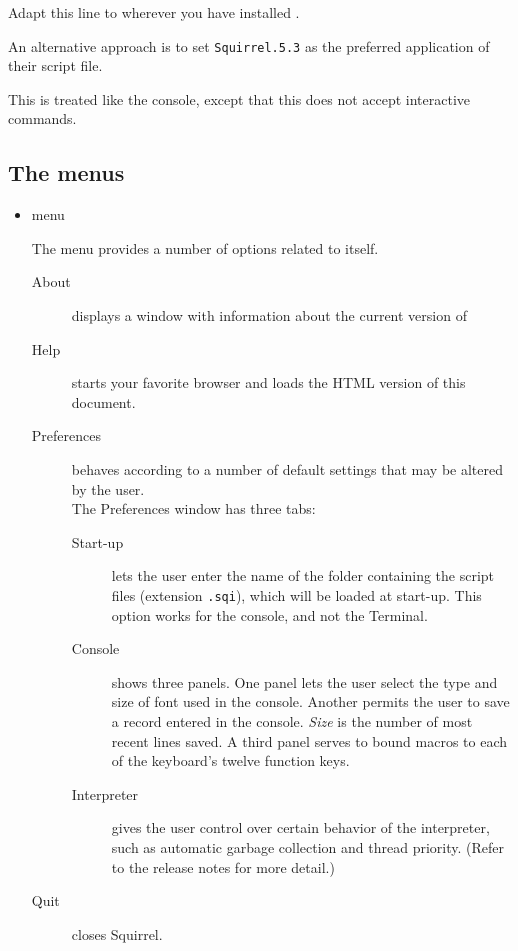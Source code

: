 Adapt this line to wherever you have installed \squirrel.
  
An alternative approach is to set {\tt Squirrel.5.3} as the preferred application of their script file. 
 
This is treated like the console, except that this does not accept interactive commands.

\subsection{The menus}

\begin{itemize}
\item \squirrel menu

The \squirrel menu provides a number of options related to \squirrel itself.

\begin{description}

\item[About] displays a window with information about the current version of \squirrel
\item[Help] starts your favorite browser and loads the HTML version of this document.
\item[Preferences] \squirrel behaves according to a number of default settings that may be altered by the user.\\
The Preferences window has three tabs: 
\begin{description}
\item[Start-up] lets the user enter the name of the folder containing the \squirrel script files (extension {\tt .sqi}), which will be loaded at start-up.  This option works for the \squirrel console, and not the \beos Terminal. 
\item[Console] shows three panels. One panel lets the user select the type and size of font used in the console. Another permits the user to save a record entered in the console. {\em Size} is the number of most recent lines saved.  A third panel serves to bound macros to each of the keyboard's twelve function keys.
\item[Interpreter] gives the user control over certain behavior of the interpreter, such as automatic garbage collection and thread priority. (Refer to the release notes for more detail.)
\end{description}
\item[Quit] closes Squirrel.
\end{description}


\end{itemize}

